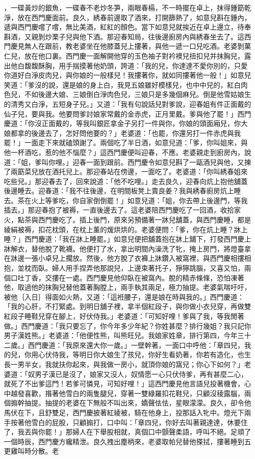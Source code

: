 ，一碟黃炒的銀魚，一碟春不老炒冬笋，兩眼春槅，不一時擺在卓上，抹得鍾筯乾淨，放在西門慶面前。良久，綉春前邊取了酒來，打開篩熱了，如意兒斟在鍾內，遞與西門慶嚐了嚐，無比美酒，紅紅的顏色。當下如意兒就挨近在卓上邊立，待奉斟酒，又親剝炒栗子兒與他下酒。那迎春知局，往後邊廚房內與綉春坐去了。這西門慶見無人在跟前，教老婆坐在他膝蓋兒上摟著，與他一遞一口兒吃酒。老婆剝菓仁兒，放在他口裏。西門慶一面解開他穿的玉色袖子對衿襖兒扭扣兒并抹胸兒，露出他白馥馥酥胸，用手揣摸著他奶頭，誇道：「我的兒，你達達不愛你別的，只愛你道好白淨皮肉兒，與你娘的一般樣兒！我摟著你，就如同摟著他一般！」如意兒笑道：「爹沒的說，還是娘的身上白，我見五娘雖好模樣兒，也中中兒的，紅白肉色兒，不如後邊大娘、三娘倒白淨肉色兒，三娘只是多幾個麻兒。倒是他雪姑娘生的清秀又白淨，五短身子兒。」又道：「我有句說話兒對爹說，迎春姐有件正面戴的仙子兒，要與我。他要問爹討娘家常戴的金赤虎，正月里戴。爹與他了罷！」西門慶道：「你沒正面戴的，等我叫銀匠拿金子另打一件與你，你娘的頭面廂兒，你大娘都拿的後邊去了，怎好問他要的？」老婆道：「也罷，你還另打一件赤虎與我罷！」一面走下來就磕頭謝了。兩個吃了半日酒，如意兒道：「爹，你叫姐來，與他一杯酒吃，惹的他不惱麼？」這西門慶便叫迎春，不應。老婆親走到廚房內，說道：「姐，爹叫你哩。」迎春一面到跟前。西門慶令如意兒斟了一甌酒兒與他，又揀了兩筯菜兒放在酒托兒上。那迎春站在傍邊，一面吃了。老婆道：「你叫綉春姐來吃些兒。」那迎春去了，回來說道：「他不吃哩。」走去良久，迎春向炕上抱他舖蓋後邊睡去。迎春道：「我不往後邊，在明間板凳上賣良姜？我與綉春廚房炕上睡去。茶在火上等爹吃，你自家倒倒罷！」如意兒道：「姐，你去帶上後邊門，等我插去。」那迎春抱了被褥，一直後邊去了。這老婆陪西門慶吃了一回酒，收拾家火，點茶與西門慶吃了。插上後門，原來另預備著一牀兒舖蓋，與西門慶睡，都是綾絹被褥，扣花枕頭，在枕上薰的煖烘烘的。老婆便問：「爹，你在炕上睡？牀上睡？」西門慶道：「我在牀上睡罷。」如意兒便把舖蓋抱在牀上舖下，打發西門慶上牀解衣，替他脫了靴襪。他便打了水，拿出明間內澡洗了牝，掩上房門，將燈臺拿在牀邊一張小卓兒上擱放。然後，他方脫了衣褲上牀鑽入被窩裡，與西門慶相摟相抱，並枕而臥。婦人用手捏弄他那說兒，上邊束著托子，猙獰跳腦，又喜又怕，兩個口吐丁香，交摟在一處。西門慶見他仰臥在被窩內。脫的精赤條條，恐怕凍著他，取過他的抹胸兒替他蓋著胸膛上，兩手執其兩足，極力抽提。老婆氣喘吁吁，被他｛入日｝得面如火熱，又道：「這袵腰子，還是娘在時與我的。」西門慶道：「我的心肝，不打緊處。到明日舖子裡，拿半個紅段子，與你做小衣兒穿，再做雙紅段子睡鞋兒穿在腳上，好伏侍我。」老婆道：「可知好哩！爹與了我，等我閒著做。」西門慶道：「我只要忘了，你今年多少年紀？你姓甚麼？排行幾姐？我只記你男子漢姓熊。」老婆道：「他便性熊，叫熊旺兒。我娘家姓章，排行第四，今年三十二歲。」西門慶道：「我原來還大你一歲。」一壁幹著，一面口中呼他：「章四兒，我的兒，你用心伏侍我，等明日你大娘生了孩兒，你好生看奶著，你若有造化，也生長一男半女，我就扶你起來，與我做一房小，就頂你娘的窩兒；你心下如何？」老婆道：「奴男子漢已是沒了，娘家又沒人，奴情愿一心只伏侍爹，再有甚麼二心，就死了不出爹這門！若爹可憐見，可知好哩！」這西門慶見他言語兒投著機會，心中越發喜歡，揝著他雪白的兩隻腿兒，穿著一雙綠羅扣花鞋兒，只顧沒稜露腦，兩個搧幹抽提。抽提的老婆在下無般不叫出來，嬌聲怯怯，星眼濛濛。良久，卻令他馬伏在下，且舒雙足，西門慶披著紅綾被，騎在他身上，投那話入牝中。燈光下兩手按著他雪白的屁股，只顧搧打，口中叫：「章四兒，你好去叫著親達達，休要住了，我丟與你罷！」那婦人在下舉股相就，真個口中顫聲柔語，呼叫不絕。足頑了一個時辰，西門慶方纔精泄。良久拽出塵柄來，老婆取帕兒替他搽拭，摟著睡到五更雞叫時分散。老